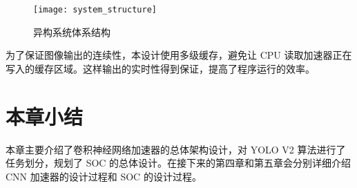 \begin{figure}[!htbp]
    \centering
    \texttt{[image: system\_structure]}
    \caption{异构系统体系结构}
    \label{fig:system_structure}
\end{figure}

为了保证图像输出的连续性，本设计使用多级缓存，避免让 CPU 读取加速器正在写入的缓存区域。这样输出的实时性得到保证，提高了程序运行的效率。

\section{本章小结}

本章主要介绍了卷积神经网络加速器的总体架构设计，对 YOLO V2 算法进行了任务划分，规划了 SOC 的总体设计。在接下来的第四章和第五章会分别详细介绍 CNN 加速器的设计过程和 SOC 的设计过程。